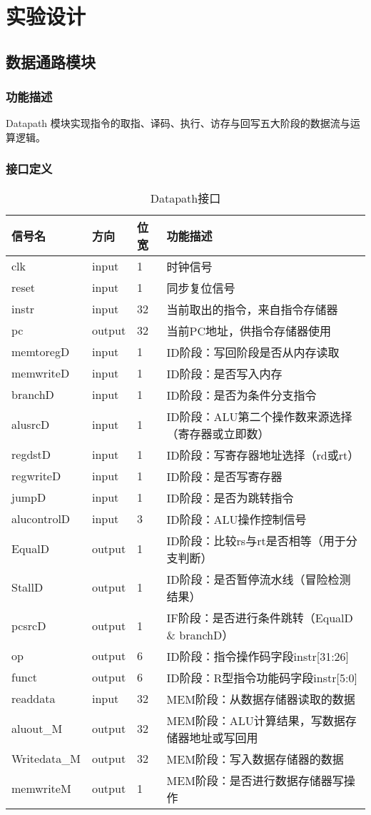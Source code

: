 \section{实验设计}
\subsection{数据通路模块}\label{sub:datapath}
\subsubsection{功能描述}
Datapath 模块实现指令的取指、译码、执行、访存与回写五大阶段的数据流与运算逻辑。
\subsubsection{接口定义}
\begin{table}[H]
\caption{Datapath接口}\label{tab:dp}
\begin{center}
	\begin{tabular}{|l|l|l|p{6cm}|}
	\hline
	\textbf{信号名} & \textbf{方向} & \textbf{位宽} & \textbf{功能描述}\\ \hline \hline
	clk & input & 1 & 时钟信号 \\
reset & input & 1 & 同步复位信号 \\
instr & input & 32 & 当前取出的指令，来自指令存储器 \\
pc & output & 32 & 当前PC地址，供指令存储器使用 \\
memtoregD & input & 1 & ID阶段：写回阶段是否从内存读取 \\
memwriteD & input & 1 & ID阶段：是否写入内存 \\
branchD & input & 1 & ID阶段：是否为条件分支指令 \\
alusrcD & input & 1 & ID阶段：ALU第二个操作数来源选择（寄存器或立即数） \\
regdstD & input & 1 & ID阶段：写寄存器地址选择（rd或rt） \\
regwriteD & input & 1 & ID阶段：是否写寄存器 \\
jumpD & input & 1 & ID阶段：是否为跳转指令 \\
alucontrolD & input & 3 & ID阶段：ALU操作控制信号 \\
EqualD & output & 1 & ID阶段：比较rs与rt是否相等（用于分支判断） \\
StallD & output & 1 & ID阶段：是否暂停流水线（冒险检测结果） \\
pcsrcD & output & 1 & IF阶段：是否进行条件跳转（EqualD \& branchD） \\
op & output & 6 & ID阶段：指令操作码字段instr[31:26] \\
funct & output & 6 & ID阶段：R型指令功能码字段instr[5:0] \\
readdata & input & 32 & MEM阶段：从数据存储器读取的数据 \\
aluout\_M & output & 32 & MEM阶段：ALU计算结果，写数据存储器地址或写回用 \\
Writedata\_M & output & 32 & MEM阶段：写入数据存储器的数据 \\
memwriteM & output & 1 & MEM阶段：是否进行数据存储器写操作 \\
	\hline
	\end{tabular}
\end{center}
\end{table}
